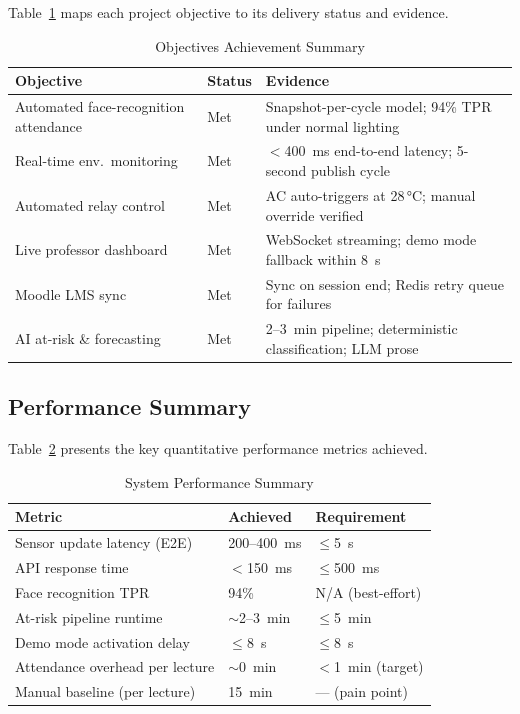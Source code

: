 Table~\ref{tab:objectives_result} maps each project objective to its
delivery status and evidence.

\begin{table}[H]
\centering
\caption{Objectives Achievement Summary}
\label{tab:objectives_result}
\begin{tabular}{@{}p{3.0cm}p{1.0cm}p{3.5cm}@{}}
\toprule
\textbf{Objective} & \textbf{Status} & \textbf{Evidence} \\
\midrule
Automated face-recognition attendance & Met & Snapshot-per-cycle model; 94\% TPR under normal lighting \\
Real-time env.\ monitoring & Met & $<$400~ms end-to-end latency; 5-second publish cycle \\
Automated relay control & Met & AC auto-triggers at 28\,°C; manual override verified \\
Live professor dashboard & Met & WebSocket streaming; demo mode fallback within 8~s \\
Moodle LMS sync & Met & Sync on session end; Redis retry queue for failures \\
AI at-risk \& forecasting & Met & 2--3~min pipeline; deterministic classification; LLM prose \\
\bottomrule
\end{tabular}
\end{table}

\subsection{Performance Summary}
\label{subsec:perf_summary}

Table~\ref{tab:perf_summary} presents the key quantitative performance
metrics achieved.

\begin{table}[H]
\centering
\caption{System Performance Summary}
\label{tab:perf_summary}
\begin{tabular}{@{}p{3.5cm}p{2.0cm}p{2.0cm}@{}}
\toprule
\textbf{Metric} & \textbf{Achieved} & \textbf{Requirement} \\
\midrule
Sensor update latency (E2E)   & 200--400~ms & $\leq$5~s \\
API response time             & $<$150~ms   & $\leq$500~ms \\
Face recognition TPR          & 94\%        & N/A (best-effort) \\
At-risk pipeline runtime      & $\sim$2--3~min & $\leq$5~min \\
Demo mode activation delay    & $\leq$8~s   & $\leq$8~s \\
Attendance overhead per lecture & $\sim$0~min & $<$1~min (target) \\
Manual baseline (per lecture) & 15~min      & — (pain point) \\
\bottomrule
\end{tabular}
\end{table}

